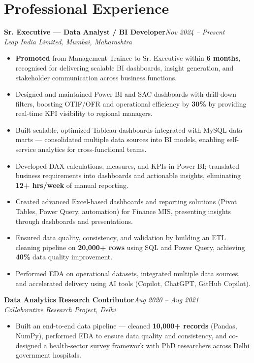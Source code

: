 \documentclass[10pt, letterpaper]{article}
\newcommand{\role}[3]{%
  \vspace{2pt}%
  {\bfseries #1}\hfill{\small\color{muted}\textit{#3}}\\[-2pt]%
  {\small\color{muted}\textit{#2}}%
}
\begin{document}
\section{Professional Experience}

\role{Sr. Executive — Data Analyst / BI Developer}{Leap India Limited, Mumbai, Maharashtra}{Nov 2024 – Present}

\begin{itemize}
  \item \textbf{Promoted} from Management Trainee to Sr. Executive within \textbf{6 months}, recognised for delivering scalable BI dashboards, insight generation, and stakeholder communication across business functions.
  \item Designed and maintained Power BI and SAC dashboards with drill-down filters, boosting OTIF/OFR and operational efficiency by \textbf{30\%} by providing real-time KPI visibility to regional managers.
  \item Built scalable, optimized Tableau dashboards integrated with MySQL data marts — consolidated multiple data sources into BI models, enabling self-service analytics for cross-functional teams.
  \item Developed DAX calculations, measures, and KPIs in Power BI; translated business requirements into dashboards and actionable insights, eliminating \textbf{12+ hrs/week} of manual reporting.
  \item Created advanced Excel-based dashboards and reporting solutions (Pivot Tables, Power Query, automation) for Finance MIS, presenting insights through dashboards and presentations.
  \item Ensured data quality, consistency, and validation by building an ETL cleaning pipeline on \textbf{20,000+ rows} using SQL and Power Query, achieving \textbf{40\%} data quality improvement.
  \item Performed EDA on operational datasets, integrated multiple data sources, and accelerated delivery using AI tools (Copilot, ChatGPT, GitHub Copilot).
\end{itemize}

\vspace{1pt}

\role{Data Analytics Research Contributor}{Collaborative Research Project, Delhi}{Aug 2020 – Aug 2021}

\begin{itemize}
  \item Built an end-to-end data pipeline — cleaned \textbf{10,000+ records} (Pandas, NumPy), performed EDA to ensure data quality and consistency, and co-designed a health-sector survey framework with PhD researchers across Delhi government hospitals.
\end{itemize}
\end{document}
